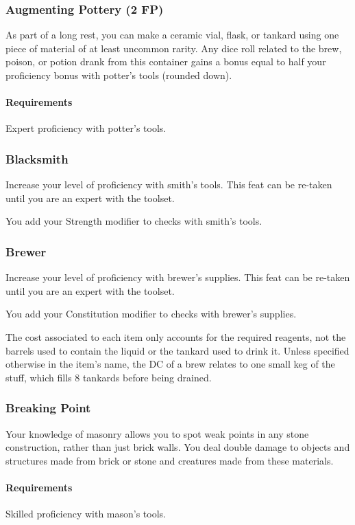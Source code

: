 \subsubsection{Augmenting Pottery (2 FP)} \label{feat::augmentingpottery}
    As part of a long rest, you can make a ceramic vial, flask, or tankard using one piece of material of at least uncommon rarity.
    Any dice roll related to the brew, poison, or potion drank from this container gains a bonus equal to half your proficiency bonus with potter's tools (rounded down).
    \paragraph{Requirements} Expert proficiency with potter's tools.
\subsubsection{Blacksmith} \label{feat::blacksmith}
    Increase your level of proficiency with smith's tools.
    This feat can be re-taken until you are an expert with the toolset.

    You add your Strength modifier to checks with smith's tools.
\subsubsection{Brewer} \label{feat::brewer}
    Increase your level of proficiency with brewer's supplies.
    This feat can be re-taken until you are an expert with the toolset.

    You add your Constitution modifier to checks with brewer's supplies.

    The cost associated to each item only accounts for the required reagents, not the barrels used to contain the liquid or the tankard used to drink it.
    Unless specified otherwise in the item's name, the DC of a brew relates to one small keg of the stuff, which fills 8 tankards before being drained.
\subsubsection{Breaking Point} \label{feat::breakingpoint}
    Your knowledge of masonry allows you to spot weak points in any stone construction, rather than just brick walls.
    You deal double damage to objects and structures made from brick or stone and creatures made from these materials.
    \paragraph{Requirements} Skilled proficiency with mason's tools.
